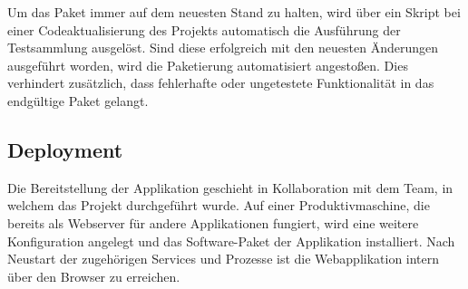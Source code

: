 Um das Paket immer auf dem neuesten Stand zu halten, wird über ein Skript bei einer
Codeaktualisierung des Projekts automatisch die Ausführung der Testsammlung ausgelöst.
Sind diese erfolgreich mit den neuesten Änderungen ausgeführt worden, wird die Paketierung
automatisiert angestoßen. Dies verhindert zusätzlich, dass fehlerhafte
oder ungetestete Funktionalität in das endgültige Paket gelangt.

\subsection{Deployment}
\label{sec:Deployment}
Die Bereitstellung der Applikation geschieht in Kollaboration mit dem Team, in welchem das
Projekt durchgeführt wurde. Auf einer Produktivmaschine, die bereits als Webserver für
andere Applikationen fungiert, wird eine weitere Konfiguration angelegt und das Software-Paket der
Applikation installiert. Nach Neustart der zugehörigen Services und Prozesse ist die
Webapplikation intern über den Browser zu erreichen.
\pagebreak

